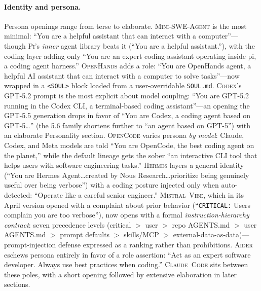 \documentclass[11pt,a4paper]{article}
\newcommand{\clcode}{\textsc{Claude~Code}\xspace}
\newcommand{\cdx}{\textsc{Codex}\xspace}
\newcommand{\oh}{\textsc{OpenHands}\xspace}
\newcommand{\adr}{\textsc{Aider}\xspace}
\newcommand{\mswe}{\textsc{Mini-SWE-Agent}\xspace}
\newcommand{\vibe}{\textsc{Mistral~Vibe}\xspace}
\newcommand{\hrm}{\textsc{Hermes}\xspace}
\newcommand{\pib}{\textsc{Pi}\xspace}
\newcommand{\ocd}{\textsc{OpenCode}\xspace}
\begin{document}
\paragraph{Identity and persona.}
Persona openings range from terse to elaborate.
\mswe{} is the most minimal: ``You are a helpful assistant that can interact with a computer''---though \pib{}'s \emph{inner} agent library beats it (``You are a helpful assistant.''), with the coding layer adding only ``You are an expert coding assistant operating inside pi, a coding agent harness.''
\oh{} adds a role: ``You are OpenHands agent, a helpful AI assistant that can interact with a computer to solve tasks''---now wrapped in a \texttt{<SOUL>} block loaded from a user-overridable \texttt{SOUL.md}.
\cdx{}'s GPT-5.2 prompt is the most explicit about model coupling: ``You are GPT-5.2 running in the Codex CLI, a terminal-based coding assistant''---an opening the GPT-5.5 generation drops in favor of ``You are Codex, a coding agent based on GPT-5\ldots'' (the 5.6 family shortens further to ``an agent based on GPT-5'') with an elaborate Personality section.
\ocd{} varies persona \emph{by model}: Claude, Codex, and Meta models are told ``You are OpenCode, the best coding agent on the planet,'' while the default lineage gets the sober ``an interactive CLI tool that helps users with software engineering tasks.''
\hrm{} layers a general identity (``You are Hermes Agent\ldots created by Nous Research\ldots prioritize being genuinely useful over being verbose'') with a coding posture injected only when auto-detected: ``Operate like a careful senior engineer.''
\vibe{}, which in its April version opened with a complaint about prior behavior (``\texttt{CRITICAL:} Users complain you are too verbose''), now opens with a formal \emph{instruction-hierarchy contract}: seven precedence levels (critical $>$ user $>$ repo AGENTS.md $>$ user AGENTS.md $>$ prompt defaults $>$ skills/MCP $>$ external-data-as-data)---prompt-injection defense expressed as a ranking rather than prohibitions.
\adr{} eschews persona entirely in favor of a role assertion: ``Act as an expert software developer. Always use best practices when coding.''
\clcode{} sits between these poles, with a short opening followed by extensive elaboration in later sections.
\end{document}
